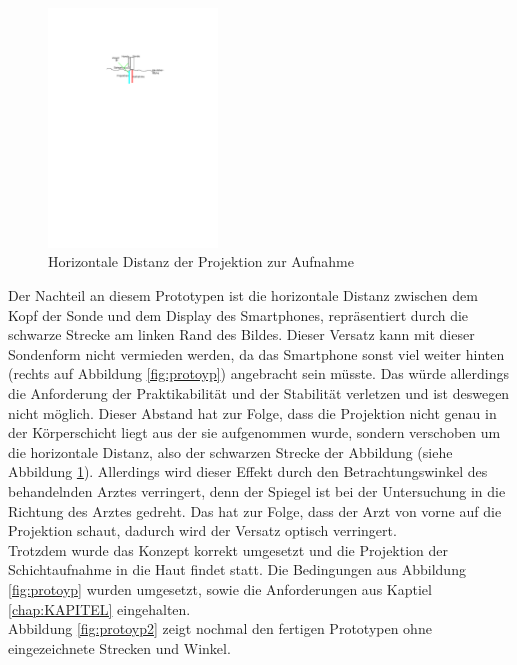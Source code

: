 \begin{figure}
\centering
\includegraphics*[width =0.4\textwidth]{Prototypen_Bau/Horizontale_distanz}
\caption{{\small Horizontale Distanz der Projektion zur Aufnahme}}
\label{fig:horizontale_distanz}
\end{figure}
Der Nachteil an diesem Prototypen ist die horizontale Distanz zwischen dem Kopf der Sonde und dem Display des Smartphones, repräsentiert durch die schwarze Strecke am linken Rand des Bildes. Dieser Versatz kann mit dieser Sondenform nicht vermieden werden, da das Smartphone sonst viel weiter hinten (rechts auf Abbildung \ref{fig:protoyp}) angebracht sein müsste. Das würde allerdings die Anforderung der Praktikabilität und der Stabilität verletzen und ist deswegen nicht möglich. Dieser Abstand hat zur Folge, dass die Projektion nicht genau in der Körperschicht liegt aus der sie aufgenommen wurde, sondern verschoben um die horizontale Distanz, also der schwarzen Strecke der Abbildung (siehe Abbildung \ref{fig:horizontale_distanz}). Allerdings wird dieser Effekt durch den Betrachtungswinkel des behandelnden Arztes verringert, denn der Spiegel ist bei der Untersuchung in die Richtung des Arztes gedreht. Das hat zur Folge, dass der Arzt von vorne auf die Projektion schaut, dadurch wird der Versatz optisch verringert.\\
Trotzdem wurde das Konzept korrekt umgesetzt und die Projektion der Schichtaufnahme in die Haut findet statt. Die Bedingungen aus Abbildung \ref{fig:protoyp} wurden umgesetzt, sowie die Anforderungen aus Kaptiel \ref{chap:KAPITEL} eingehalten.\\ 
Abbildung \ref{fig:protoyp2} zeigt nochmal den fertigen Prototypen ohne eingezeichnete Strecken und Winkel.
